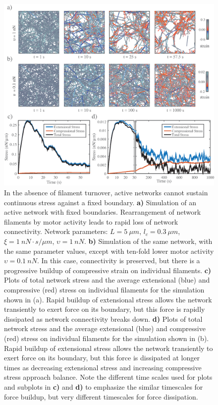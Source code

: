 \documentclass[10pt,letterpaper]{article}
\begin{document}
\begin{figure}[h!]
	\centering
	\includegraphics[width=\hsize]{figures/figure6}
	\caption{\label{fig:active_str} In the absence of filament turnover, active networks cannot sustain continuous stress against a fixed boundary.  \textbf{a)} Simulation of an active network with fixed boundaries. Rearrangement of network filaments by motor activity leads to rapid loss of network connectivity.  Network parameters: $L=5\: \mu m$, $l_c=0.3\: \mu m$, $\xi=1\: nN\cdot s/\mu m$, $\upsilon=1\: nN$.  \textbf{b)} Simulation of the same network, with the same parameter values, except with ten-fold lower motor activity $\upsilon=0.1\: nN$. In this case, connectivity is preserved, but there is a progressive buildup of compressive strain on individual filaments.  \textbf{c)} Plots of total network stress and the average extensional (blue) and compressive (red) stress on individual filaments for the simulation shown in (a). Rapid buildup of extensional stress allows the network transiently to exert force on its boundary, but this force is rapidly dissipated as network connectivity breaks down.  \textbf{d)} Plots of total network stress and the average extensional (blue) and compressive (red) stress on individual filaments for the simulation shown in (b). Rapid buildup of extensional stress allows the network transiently to exert force on its boundary, but this force is dissipated at longer times as decreasing extensional stress and increasing compressive stress approach balance.  Note the different time scales used for plots and subplots in \textbf{c)} and \textbf{d)} to emphasize the similar timescales for force buildup, but very different timescales for force dissipation.}
\end{figure}
\end{document}
